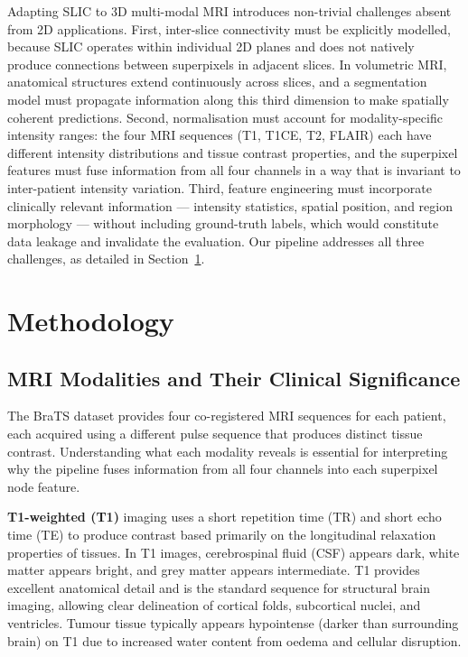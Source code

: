 \documentclass{article}
\begin{document}
Adapting SLIC to 3D multi-modal MRI introduces non-trivial challenges absent
from 2D applications. First, inter-slice connectivity must be explicitly
modelled, because SLIC operates within individual 2D planes and does not
natively produce connections between superpixels in adjacent slices. In
volumetric MRI, anatomical structures extend continuously across slices, and a
segmentation model must propagate information along this third dimension to make
spatially coherent predictions. Second, normalisation must account for
modality-specific intensity ranges: the four MRI sequences (T1, T1CE, T2,
FLAIR) each have different intensity distributions and tissue contrast
properties, and the superpixel features must fuse information from all four
channels in a way that is invariant to inter-patient intensity variation.
Third, feature engineering must incorporate clinically relevant information ---
intensity statistics, spatial position, and region morphology --- without
including ground-truth labels, which would constitute data leakage and
invalidate the evaluation. Our pipeline addresses all three challenges, as
detailed in Section~\ref{sec:method}.

\section{Methodology}
\label{sec:method}

\subsection{MRI Modalities and Their Clinical Significance}
\label{sec:modalities}

The BraTS dataset provides four co-registered MRI sequences for each patient,
each acquired using a different pulse sequence that produces distinct tissue
contrast. Understanding what each modality reveals is essential for interpreting
why the pipeline fuses information from all four channels into each superpixel
node feature.

\textbf{T1-weighted (T1)} imaging uses a short repetition time (TR) and short
echo time (TE) to produce contrast based primarily on the longitudinal
relaxation properties of tissues. In T1 images, cerebrospinal fluid (CSF)
appears dark, white matter appears bright, and grey matter appears intermediate.
T1 provides excellent anatomical detail and is the standard sequence for
structural brain imaging, allowing clear delineation of cortical folds,
subcortical nuclei, and ventricles. Tumour tissue typically appears
hypointense (darker than surrounding brain) on T1 due to increased water
content from oedema and cellular disruption.
\end{document}
